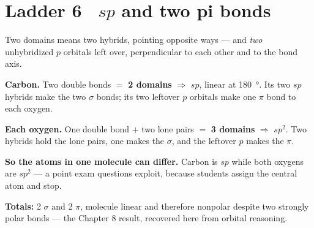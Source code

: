\documentclass{apchem-worksheet}
\begin{document}
\section*{\sffamily Ladder 6 \textbullet\ $sp$ and two pi bonds}

Two domains means two hybrids, pointing opposite ways --- and
\emph{two} unhybridized $p$ orbitals left over, perpendicular to each
other and to the bond axis.

\begin{center}
\end{center}

\begin{workedexample}
\textbf{Carbon.} Two double bonds $=$ \textbf{2 domains} $\Rightarrow$
\textbf{$sp$}, linear at \SI{180}{\degree}. Its two $sp$ hybrids make the
two $\sigma$ bonds; its two leftover $p$ orbitals make one $\pi$ bond to
each oxygen.

\textbf{Each oxygen.} One double bond $+$ two lone pairs $=$
\textbf{3 domains} $\Rightarrow$ \textbf{$sp^{2}$}. Two hybrids hold the
lone pairs, one makes the $\sigma$, and the leftover $p$ makes the $\pi$.

\textbf{So the atoms in one molecule can differ.} Carbon is $sp$ while
both oxygens are $sp^{2}$ --- a point exam questions exploit, because
students assign the central atom and stop.

\textbf{Totals:} 2 $\sigma$ and 2 $\pi$, molecule linear and therefore
nonpolar despite two strongly polar bonds --- the Chapter 8 result,
recovered here from orbital reasoning.
\end{workedexample}
\end{document}
